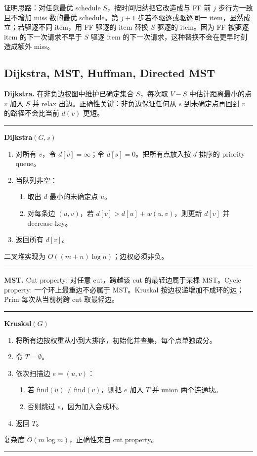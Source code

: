 \documentclass[UTF8,a4paper,11pt]{ctexart}
\newenvironment{algobox}[1]
{\par\medskip\noindent\begin{minipage}{0.96\linewidth}\hrule\vspace{0.35em}\textbf{#1}\par\vspace{0.25em}\small}
{\par\vspace{0.25em}\hrule\end{minipage}\par\medskip}
\begin{document}
证明思路：对任意最优 schedule $S$，按时间归纳把它改造成与 FF 前 $j$ 步行为一致且不增加 miss 数的最优 schedule。第 $j+1$ 步若不驱逐或驱逐同一 item，显然成立；若驱逐不同 item，用 FF 驱逐的 item 替换 $S$ 驱逐的 item。因为 FF 被驱逐 item 的下一次请求不早于 $S$ 驱逐 item 的下一次请求，这种替换不会在更早时刻造成额外 miss。

\subsection{Dijkstra, MST, Huffman, Directed MST}

\textbf{Dijkstra.} 在非负边权图中维护已确定集合 $S$，每次取 $V-S$ 中估计距离最小的点 $v$ 加入 $S$ 并 relax 出边。正确性关键：非负边保证任何从 $s$ 到未确定点再回到 $v$ 的路径不会比当前 $d(v)$ 更短。

\begin{algobox}{Dijkstra$(G,s)$}
\begin{enumerate}
  \item 对所有 $v$，令 $d[v]=\infty$；令 $d[s]=0$。把所有点放入按 $d$ 排序的 priority queue。
  \item 当队列非空：
  \begin{enumerate}
    \item 取出 $d$ 最小的未确定点 $u$。
    \item 对每条边 $(u,v)$，若 $d[v]>d[u]+w(u,v)$，则更新 $d[v]$ 并 decrease-key。
  \end{enumerate}
  \item 返回所有 $d[v]$。
\end{enumerate}
二叉堆实现为 $O((m+n)\log n)$；边权必须非负。
\end{algobox}

\textbf{MST.} Cut property: 对任意 cut，跨越该 cut 的最轻边属于某棵 MST。Cycle property: 一个环上最重边不必属于 MST。Kruskal 按边权递增加不成环的边；Prim 每次从当前树跨 cut 取最轻边。

\begin{algobox}{Kruskal$(G)$}
\begin{enumerate}
  \item 将所有边按权重从小到大排序，初始化并查集，每个点单独成分。
  \item 令 $T=\emptyset$。
  \item 依次扫描边 $e=(u,v)$：
  \begin{enumerate}
    \item 若 $\mathrm{find}(u)\ne \mathrm{find}(v)$，则把 $e$ 加入 $T$ 并 union 两个连通块。
    \item 否则跳过 $e$，因为加入会成环。
  \end{enumerate}
  \item 返回 $T$。
\end{enumerate}
复杂度 $O(m\log m)$，正确性来自 cut property。
\end{algobox}
\end{document}
